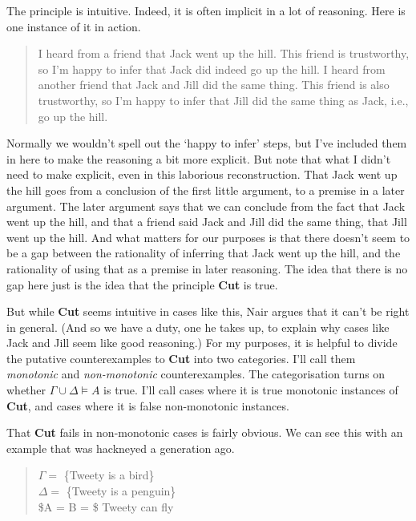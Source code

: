 \documentclass[11pt,]{book}
\begin{document}
The principle is intuitive. Indeed, it is often implicit in a lot of reasoning. Here is one instance of it in action.

\begin{quote}
I heard from a friend that Jack went up the hill. This friend is trustworthy, so I'm happy to infer that Jack did indeed go up the hill. I heard from another friend that Jack and Jill did the same thing. This friend is also trustworthy, so I'm happy to infer that Jill did the same thing as Jack, i.e., go up the hill.
\end{quote}

Normally we wouldn't spell out the `happy to infer' steps, but I've included them in here to make the reasoning a bit more explicit. But note that what I didn't need to make explicit, even in this laborious reconstruction. That Jack went up the hill goes from a conclusion of the first little argument, to a premise in a later argument. The later argument says that we can conclude from the fact that Jack went up the hill, and that a friend said Jack and Jill did the same thing, that Jill went up the hill. And what matters for our purposes is that there doesn't seem to be a gap between the rationality of inferring that Jack went up the hill, and the rationality of using that as a premise in later reasoning. The idea that there is no gap here just is the idea that the principle \textbf{Cut} is true.

But while \textbf{Cut} seems intuitive in cases like this, Nair argues that it can't be right in general. (And so we have a duty, one he takes up, to explain why cases like Jack and Jill seem like good reasoning.) For my purposes, it is helpful to divide the putative counterexamples to \textbf{Cut} into two categories. I'll call them \emph{monotonic} and \emph{non-monotonic} counterexamples. The categorisation turns on whether \(\Gamma \cup \Delta \vDash A\) is true. I'll call cases where it is true monotonic instances of \textbf{Cut}, and cases where it is false non-monotonic instances.

That \textbf{Cut} fails in non-monotonic cases is fairly obvious. We can see this with an example that was hackneyed a generation ago.

\begin{quote}
\(\Gamma =\) \{Tweety is a bird\}\\
\(\Delta =\) \{Tweety is a penguin\}\\
\$A = B = \$ Tweety can fly
\end{quote}
\end{document}
